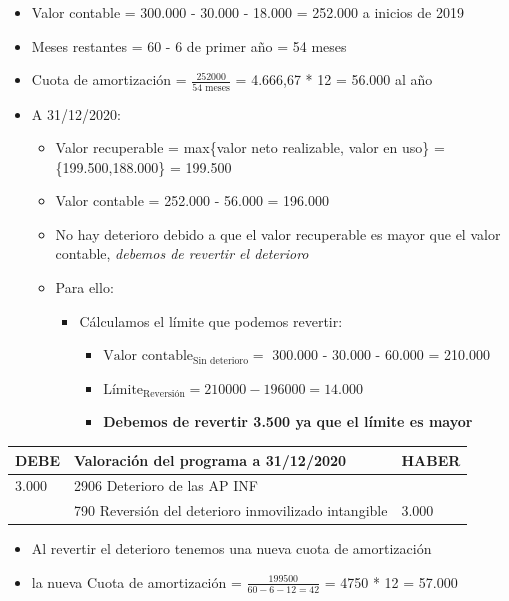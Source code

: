 \documentclass[a4paper,12pt]{article}
\newcommand{\fec}{31/12/}
\newcommand{\valorrecuperable}{Valor recuperable = max\{valor neto realizable, valor en uso\} =}
\newcommand{\VC}{Valor contable = }
\newcommand{\cuotaamort}{Cuota de amortización = }
\newcommand{\myequation}[2]{\ensuremath{\frac{#1}{#2}}}
\newcommand{\negrita}[1]{\textbf{#1}}
\begin{document}
\begin{itemize}
    \item \VC 300.000 - 30.000 - 18.000 = 252.000 a inicios de 2019
    \item Meses restantes = 60 - 6 de primer año = 54 meses
    \item \cuotaamort \myequation{252000}{54 \text{ meses}} = 4.666,67 * 12 = 56.000 al año
    \item A \fec2020:
    \begin{itemize}
        \item \valorrecuperable \{199.500,188.000\} = 199.500
        \item \VC 252.000 - 56.000 = 196.000
        \item No hay deterioro debido a que el valor recuperable es mayor que el valor contable, \textit{debemos de revertir el deterioro}
        \item Para ello:
        \begin{itemize}
            \item Cálculamos el límite que podemos revertir:
            \begin{itemize}
                \item $\text{Valor contable}_{\text{Sin deterioro}} = $ 300.000 - 30.000 - 60.000  = 210.000
                \item $\text{Límite}_{\text{Reversión}} = 210000 - 196000 = 14.000$
                \item \textbf{Debemos de revertir 3.500 ya que el límite es mayor}
            \end{itemize}
        \end{itemize}
    \end{itemize}
\end{itemize}

\begin{table}[H]
    \centering
    \begin{tabular}{|p{3cm}|p{6cm}|p{3cm}|}
    \hline
    \textbf{DEBE} & \textbf{Valoración del programa a \fec2020} & \textbf{HABER} \\
    \hline
    3.000& 2906 Deterioro de las AP INF& \\
    \hline
    & 790 Reversión del deterioro inmovilizado intangible & 3.000\\
    \hline
    \end{tabular}
\end{table}

\begin{itemize}
    \item Al revertir el deterioro tenemos una nueva cuota de amortización 
    \item la nueva \cuotaamort \myequation{199500}{60 - 6 - 12 = 42} = 4750 * 12 = 57.000
\end{itemize}
\end{document}
